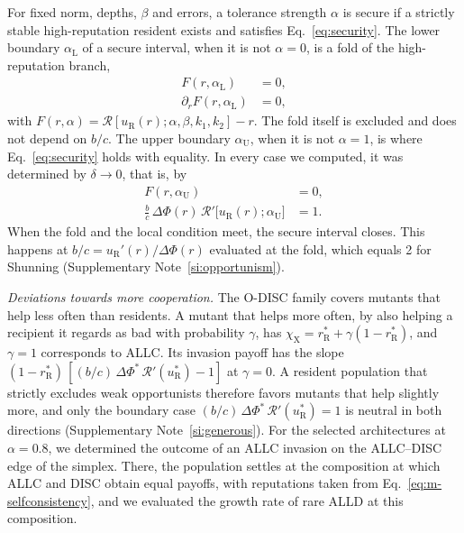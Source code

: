 \documentclass[10pt]{wlscirep}
\newcommand{\Rmap}{\mathscr{R}}            %
\newcommand{\rR}{r_{\mathrm{R}}^{*}}
\newcommand{\uR}{u_{\mathrm{R}}^{*}}
\newcommand{\dPhi}{\Delta\Phi^{*}}
\theoremstyle{plain}
\theoremstyle{remark}
\begin{document}
For fixed norm, depths, $\beta$ and errors, a tolerance strength $\alpha$ is secure if a strictly stable high-reputation resident exists and satisfies Eq.~\eqref{eq:security}. The lower boundary $\alpha_{\mathrm L}$ of a secure interval, when it is not $\alpha=0$, is a fold of the high-reputation branch,
\begin{equation}
\begin{aligned}
F(r,\alpha_{\mathrm L})&=0,\\
\partial_rF(r,\alpha_{\mathrm L})&=0,
\end{aligned}
\label{eq:m-fold}
\end{equation}
with $F(r,\alpha)=\Rmap[u_{\mathrm R}(r);\alpha,\beta,k_1,k_2]-r$. The fold itself is excluded and does not depend on $b/c$. The upper boundary $\alpha_{\mathrm U}$, when it is not $\alpha=1$, is where Eq.~\eqref{eq:security} holds with equality. In every case we computed, it was determined by $\delta\to0$, that is, by
\begin{equation}
\begin{aligned}
F(r,\alpha_{\mathrm U})&=0,\\
\frac{b}{c}\,\Delta\Phi(r)\,\Rmap'\bigl[u_{\mathrm R}(r);\alpha_{\mathrm U}\bigr]&=1.
\end{aligned}
\label{eq:m-upper}
\end{equation}
When the fold and the local condition meet, the secure interval closes. This happens at $b/c=u_{\mathrm R}'(r)/\Delta\Phi(r)$ evaluated at the fold, which equals 2 for Shunning (Supplementary Note~\ref{si:opportunism}).

\textit{Deviations towards more cooperation.} The O-DISC family covers mutants that help less often than residents. A mutant that helps more often, by also helping a recipient it regards as bad with probability $\gamma$, has $\chi_{\mathrm X}=\rR+\gamma(1-\rR)$, and $\gamma=1$ corresponds to ALLC. Its invasion payoff has the slope $(1-\rR)\,[(b/c)\,\dPhi\,\Rmap'(\uR)-1]$ at $\gamma=0$. A resident population that strictly excludes weak opportunists therefore favors mutants that help slightly more, and only the boundary case $(b/c)\,\dPhi\,\Rmap'(\uR)=1$ is neutral in both directions (Supplementary Note~\ref{si:generous}). For the selected architectures at $\alpha=0.8$, we determined the outcome of an ALLC invasion on the ALLC--DISC edge of the simplex. There, the population settles at the composition at which ALLC and DISC obtain equal payoffs, with reputations taken from Eq.~\eqref{eq:m-selfconsistency}, and we evaluated the growth rate of rare ALLD at this composition.
\end{document}
